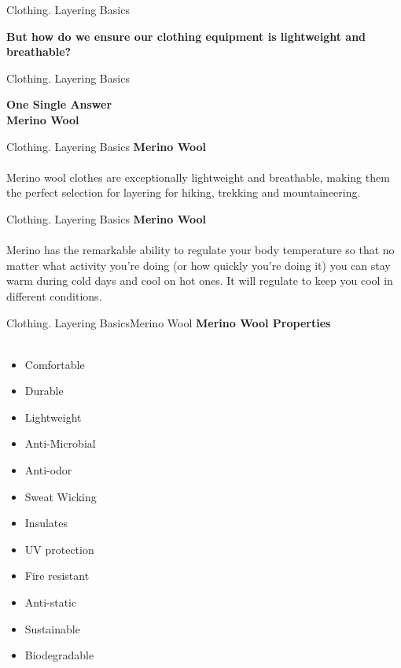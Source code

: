 \documentclass[xcolor=dvipsnames,aspectratio=1610]{beamer}
\begin{document}
\begin{frame}{Clothing. Layering Basics}
\begin{center}
\huge 
\textbf {But how do we ensure our clothing equipment is lightweight and breathable?}
\end{center}
\end{frame}


\begin{frame}{Clothing. Layering Basics}
\begin{center}
\Huge \textbf{
One Single Answer\\
\alert{Merino Wool}}
\end{center}
\end{frame}


\begin{frame}{Clothing. Layering Basics}{}
\LARGE
\textbf{Merino Wool}\\~\\
\Large
 Merino wool clothes are exceptionally lightweight and breathable, making them
 the perfect selection for layering for hiking, trekking and mountaineering.
\end{frame}


\begin{frame}{Clothing. Layering Basics}{}
\LARGE
\textbf{Merino Wool}\\~\\
\Large
Merino has the remarkable ability to regulate your body temperature so that no 
matter what activity you’re doing (or how quickly you’re doing it) you can stay 
warm during cold days and cool on hot ones. It will regulate to keep you cool in 
different conditions.
\end{frame}


\begin{frame}{Clothing. Layering Basics}{Merino Wool}
\LARGE
\textbf{Merino Wool Properties}\\~\\ 
    \begin{multicols}{3}
    \begin{itemize}
        \item Comfortable
        \item Durable
        \item Lightweight
        \item Anti-Microbial
        \item Anti-odor
        \item Sweat Wicking
        \item Insulates
        \item UV protection
        \item Fire resistant
        \item Anti-static
        \item Sustainable
        \item Biodegradable
    \end{itemize}
    \end{multicols}
\end{frame}
\end{document}
